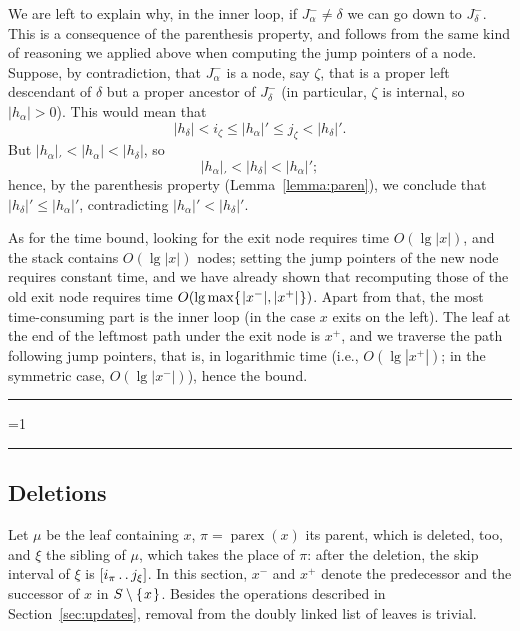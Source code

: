 \documentclass[a4paper]{article}
\newcounter{noqed}
\newcommand{\qed}{ \ifmmode\mbox{
}\fi\rule[-.05em]{.3em}{.7em}\setcounter{noqed}{0}}
\newenvironment{proof}[1][{}]{\noindent{\bf Proof#1.
}\setcounter{noqed}{1}}{\ifnum\value{noqed}=1\qed\fi\par\medskip}
\newcommand{\parex}[1]{\operatorname{parex}(#1)}
\newcommand{\?}{\mskip1.5mu}
\def\..{\,\mathpunct{\ldotp\ldotp}} %
\begin{document}
\begin{proof}
We are left to explain why, in the inner loop, if $J^-_\alpha\neq \delta$ we can go down to $J^-_\delta$.
This is a consequence of the parenthesis property, and follows from the same kind of reasoning we
applied above when computing the jump pointers of a node.
Suppose, by contradiction, that $J^-_\alpha$ is a node, say $\zeta$, that is a proper left descendant of $\delta$ but a proper ancestor of
$J^-_\delta$ (in particular, $\zeta$ is internal, so $|h_\alpha|>0$). This would mean that
\[
	|h_\delta| < i_\zeta \leq |h_\alpha|'\leq j_\zeta  < |h_\delta|'.
\]
But $|h_\alpha|_\prime<|h_\alpha|<|h_\delta|$, so
\[
	|h_\alpha|_\prime < |h_\delta| < |h_\alpha|';
\]
hence, by the parenthesis property (Lemma~\ref{lemma:paren}), we conclude that $|h_\delta|'\leq |h_\alpha|'$, 
contradicting $|h_\alpha|'<|h_\delta|'$.

As for the time bound, looking for the exit node requires time $O(\lg |x|)$, and the stack contains $O(\lg|x|)$ nodes;
setting the jump pointers of the new node requires constant time, and we have already shown that recomputing 
those of the old exit node requires time $O(\lg\max\{\?|x^-|,|x^+|\?\})$.
Apart from that, the most time-consuming part is the inner loop (in the case $x$ exits on the left). The
leaf at the end of the leftmost path under the exit node is $x^+$, and we traverse the path following jump pointers, that is, in logarithmic
time (i.e., $O(\lg |x^+|)$; in the symmetric case, $O(\lg|x^-|)$), hence the bound.
\qed
\end{proof}


\subsection{Deletions} 

Let $\mu$ be the leaf containing $x$, $\pi=\parex x$ its parent, which is deleted, too, and $\xi$ the sibling of $\mu$,
which takes the place of $\pi$: after the deletion, the skip interval of $\xi$ is $[i_\pi\..j_\xi]$. 
In this section, $x^-$ and $x^+$ denote the predecessor and the successor of $x$ in $S\setminus\{\?x\?\}$.
Besides the operations described in Section~\ref{sec:updates}, removal from the doubly linked list
of leaves is trivial.
\end{document}
